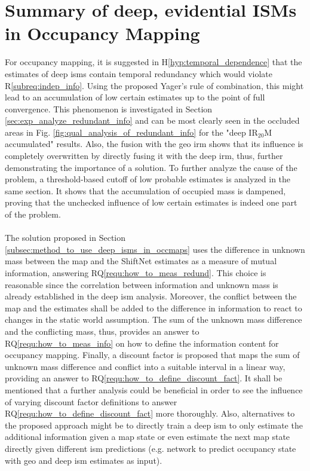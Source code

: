 \section{Summary of deep, evidential ISMs in Occupancy Mapping}
\label{sec:disc_deep_ev_isms_in_occ_maps}
For occupancy mapping, it is suggested in H\ref{hyp:temporal_dependence} that the estimates of deep \gls{ism}s contain temporal redundancy which would violate R\ref{subreq:indep_info}. Using the proposed Yager's rule of combination, this might lead to an accumulation of low certain estimates up to the point of full convergence. This phenomenon is investigated in Section \ref{sec:exp_analyze_redundant_info} and can be most clearly seen in the occluded areas in Fig. \ref{fig:qual_analysis_of_redundant_info} for the "deep IR$_{20}$M accumulated" results. Also, the fusion with the geo \gls{irm} shows that its influence is completely overwritten by directly fusing it with the deep \gls{irm}, thus, further demonstrating the importance of a solution. To further analyze the cause of the problem, a threshold-based cutoff of low probable estimates is analyzed in the same section. It shows that the accumulation of occupied mass is dampened, proving that the unchecked influence of low certain estimates is indeed one part of the problem.
\\\\
The solution proposed in Section \ref{subsec:method_to_use_deep_isms_in_occmaps} uses the difference in unknown mass between the map and the ShiftNet estimates as a measure of mutual information, answering RQ\ref{requ:how_to_meas_redund}. This choice is reasonable since the correlation between information and unknown mass is already established in the deep \gls{ism} analysis. Moreover, the conflict between the map and the estimates shall be added to the difference in information to react to changes in the static world assumption. The sum of the unknown mass difference and the conflicting mass, thus, provides an answer to RQ\ref{requ:how_to_meas_info} on how to define the information content for occupancy mapping. Finally, a discount factor is proposed that maps the sum of unknown mass difference and conflict into a suitable interval in a linear way, providing an answer to RQ\ref{requ:how_to_define_discount_fact}. It shall be mentioned that a further analysis could be beneficial in order to see the influence of varying discount factor definitions to answer RQ\ref{requ:how_to_define_discount_fact} more thoroughly. Also, alternatives to the proposed approach might be to directly train a deep \gls{ism} to only estimate the additional information given a map state or even estimate the next map state directly given different \gls{ism} predictions (e.g. network to predict occupancy state with geo and deep \gls{ism} estimates as input).

